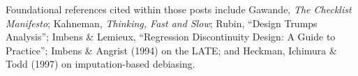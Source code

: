 \documentclass[11pt]{article}
\begin{document}
\noindent Foundational references cited within those posts include Gawande,
\emph{The Checklist Manifesto}; Kahneman, \emph{Thinking, Fast and Slow}; Rubin,
``Design Trumps Analysis''; Imbens \& Lemieux, ``Regression Discontinuity Design:
A Guide to Practice''; Imbens \& Angrist (1994) on the LATE; and Heckman,
Ichimura \& Todd (1997) on imputation-based debiasing.
\end{document}
